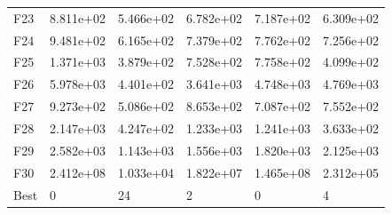 \begin{tabular}{llllll}
F23  &  8.811e+02 &  5.466e+02 &  6.782e+02 &  7.187e+02 &  6.309e+02 \\
F24  &  9.481e+02 &  6.165e+02 &  7.379e+02 &  7.762e+02 &  7.256e+02 \\
F25  &  1.371e+03 &  3.879e+02 &  7.528e+02 &  7.758e+02 &  4.099e+02 \\
F26  &  5.978e+03 &  4.401e+02 &  3.641e+03 &  4.748e+03 &  4.769e+03 \\
F27  &  9.273e+02 &  5.086e+02 &  8.653e+02 &  7.087e+02 &  7.552e+02 \\
F28  &  2.147e+03 &  4.247e+02 &  1.233e+03 &  1.241e+03 &  3.633e+02 \\
F29  &  2.582e+03 &  1.143e+03 &  1.556e+03 &  1.820e+03 &  2.125e+03 \\
F30  &  2.412e+08 &  1.033e+04 &  1.822e+07 &  1.465e+08 &  2.312e+05 \\
Best &          0 &         24 &          2 &          0 &          4 \\
\bottomrule
\end{tabular}
